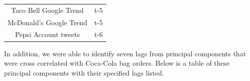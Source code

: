 \documentclass[12pt,oneside]{chicagocapstone}
\begin{document}
\begin{longtable}[]{@{}cc@{}}
\begin{minipage}[t]{0.44\columnwidth}\centering
Taco Bell Google Trend\strut
\end{minipage} & \begin{minipage}[t]{0.39\columnwidth}\centering
t-5\strut
\end{minipage}\tabularnewline
\begin{minipage}[t]{0.44\columnwidth}\centering
McDonald's Google Trend\strut
\end{minipage} & \begin{minipage}[t]{0.39\columnwidth}\centering
t-5\strut
\end{minipage}\tabularnewline
\begin{minipage}[t]{0.44\columnwidth}\centering
Pepsi Account tweets\strut
\end{minipage} & \begin{minipage}[t]{0.39\columnwidth}\centering
t-6\strut
\end{minipage}\tabularnewline
\bottomrule
\end{longtable}
In addition, we were able to identify seven lags from principal components that were cross correlated with Coca-Cola bag orders. Below is a table of these principal components with their specified lags listed.
\end{document}
